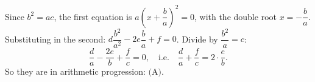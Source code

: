 Since $b^2=ac$, the first equation is $a\left(x+\dfrac {b}{a}\right)^2=0$, with the double root $x=-\dfrac {b}{a}$. Substituting in the second: $d\dfrac{b^2}{a^2}-2e\dfrac {b}{a}+f=0$. Divide by $\dfrac{b^2}{a}=c$:
\[\dfrac {d}{a}-\dfrac{2e}{b}+\dfrac {f}{c}=0,\quad\text{i.e.}\quad\dfrac {d}{a}+\dfrac {f}{c}=2\cdot\dfrac {e}{b}.\]
So they are in arithmetic progression: $\boxed{\text{(A)}}$.
